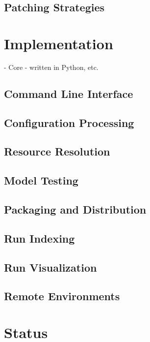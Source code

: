 \documentclass{article}
\begin{document}
\subsection{Patching Strategies}

\section{Implementation}

- Core - written in Python, etc.

\subsection{Command Line Interface}

\subsection{Configuration Processing}

\subsection{Resource Resolution}

\subsection{Model Testing}

\subsection{Packaging and Distribution}

\subsection{Run Indexing}

\subsection{Run Visualization}

\subsection{Remote Environments}

\section{Status}
\end{document}
